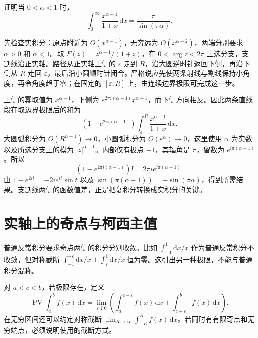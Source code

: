 \begin{example}[钥匙孔路径]
\label{ex:ca-keyhole}
证明当 $0<\alpha<1$ 时，
\begin{equation}
 \int_0^\infty\frac{x^{\alpha-1}}{1+x}\,\mathrm dx
 =\frac\pi{\sin(\pi\alpha)}.
 \label{eq:ca-keyhole-integral}
\end{equation}
\end{example}
\begin{solve}
先检查实积分：原点附近为 $O(x^{\alpha-1})$，无穷远为 $O(x^{\alpha-2})$，两端分别要求 $\alpha>0$ 和 $\alpha<1$。取 $F(z)=z^{\alpha-1}/(1+z)$，在 $0<\arg z<2\pi$ 上选分支，支割线沿正实轴。路径从正实轴上侧的 $\varepsilon$ 走到 $R$，沿大圆逆时针返回下侧，再沿下侧从 $R$ 走回 $\varepsilon$，最后沿小圆顺时针闭合。严格说应先使两条射线与割线保持小角度，再令角度趋于零；在固定的 $[\varepsilon,R]$ 上，由连续边界极限可完成这一步。

上侧的幂取值为 $x^{\alpha-1}$，下侧为 $e^{2\pi i(\alpha-1)}x^{\alpha-1}$，而下侧方向相反。因此两条直线段在取边界极限后的和为
\[
 \left(1-e^{2\pi i(\alpha-1)}\right)
 \int_\varepsilon^R\frac{x^{\alpha-1}}{1+x}\,\mathrm dx.
\]
大圆弧积分为 $O(R^{\alpha-1})\to0$，小圆弧积分为 $O(\varepsilon^\alpha)\to0$，这里使用 $\alpha$ 为实数以及所选分支上的模为 $|z|^{\alpha-1}$。内部仅有极点 $-1$，其辐角是 $\pi$，留数为 $e^{i\pi(\alpha-1)}$。所以
\[
 \left(1-e^{2\pi i(\alpha-1)}\right)I
 =2\pi i e^{i\pi(\alpha-1)}.
\]
由 $1-e^{2it}=-2ie^{it}\sin t$ 以及 $\sin(\pi(\alpha-1))=-\sin(\pi\alpha)$，得到所需结果。支割线两侧的函数值差，正是把复积分转换成实积分的关键。
\end{solve}

\section{实轴上的奇点与柯西主值}

普通反常积分要求奇点两侧的积分分别收敛。比如 $\int_{-1}^1\mathrm dx/x$ 作为普通反常积分不收敛，但对称截断 $\int_{-1}^{-\varepsilon}\mathrm dx/x+\int_\varepsilon^1\mathrm dx/x$ 恒为零。这引出另一种极限，不能与普通积分混称。

\begin{definition}[柯西主值]
对 $a<c<b$，若极限存在，定义
\[
 \operatorname{PV}\int_a^b f(x)\,\mathrm dx
 =\lim_{\varepsilon\downarrow0}
 \left(\int_a^{c-\varepsilon}f(x)\,\mathrm dx
 +\int_{c+\varepsilon}^bf(x)\,\mathrm dx\right).
\]
在无穷区间还可以约定对称截断 $\lim_{R\to\infty}\int_{-R}^Rf(x)\,\mathrm dx$。若同时有有限奇点和无穷端点，必须说明使用的截断方式。
\end{definition}

